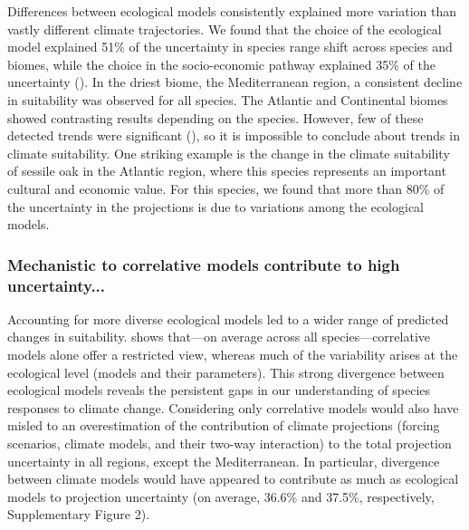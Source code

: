 \documentclass[11pt,letter]{article}
\begin{document}
Differences between ecological models consistently explained more variation than vastly different climate trajectories. We found that the choice of the ecological model explained 51\% of the uncertainty in species range shift across species and biomes, while the choice in the socio-economic pathway explained 35\% of the uncertainty (). In the driest biome, the Mediterranean region, a consistent decline in suitability was observed for all species. The Atlantic and Continental biomes showed contrasting results depending on the species. 
However, few of these detected trends were significant (), so it is impossible to conclude about trends in climate suitability. One striking example is the change in the climate suitability of sessile oak in the Atlantic region, where this species represents an important cultural and economic value. For this species, we found that more than 80\% of the uncertainty in the projections is due to variations among the ecological models. 


\subsubsection*{Mechanistic to correlative models contribute to high uncertainty...}

Accounting for more diverse ecological models led to a wider range of predicted changes in suitability.  shows that---on average across all species---correlative models alone offer a restricted view, whereas much of the variability arises at the ecological level (models and their parameters). This strong divergence between ecological models reveals the persistent gaps in our understanding of species responses to climate change. Considering only correlative models would also have misled to an overestimation of the contribution of climate projections (forcing scenarios, climate models, and their two-way interaction) to the total projection uncertainty in all regions, except the Mediterranean. In particular, divergence between climate models would have appeared to contribute as much as ecological models to projection uncertainty (on average, 36.6\% and 37.5\%, respectively, Supplementary Figure 2). 
\end{document}
